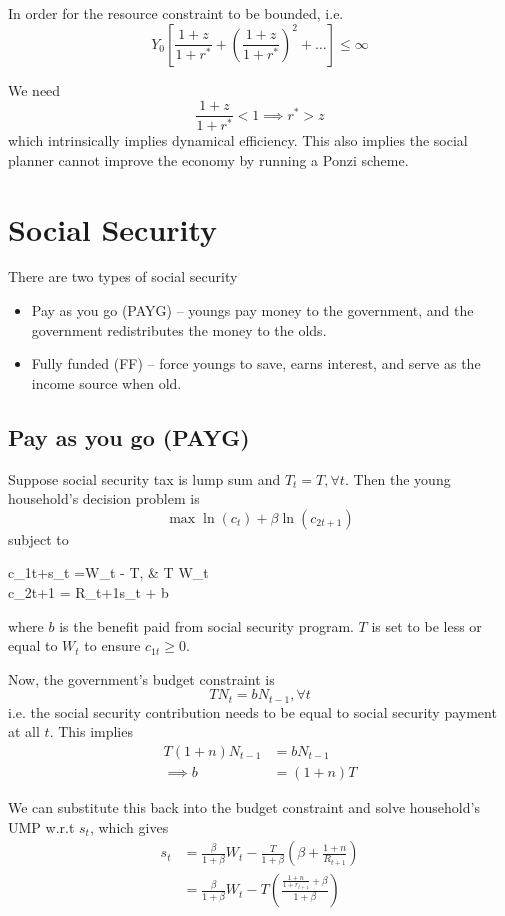 \documentclass[twocolumn, fleqn]{article}
\begin{document}
		In order for the resource constraint to be bounded, i.e.
		\[Y_0\left[ \frac{1+z}{1+r^\ast} + \left( \frac{1+z}{1+r^\ast} \right)^2 +\ldots \right]\leq \infty\]

		We need \[\frac{1+z}{1+r^\ast}<1 \implies r^\ast >z\]
		which intrinsically implies dynamical efficiency.
		This also implies the social planner cannot improve the economy by running a Ponzi scheme.

	\section{Social Security}\label{sec:social-security}
		There are two types of social security
		\begin{itemize}
			\item Pay as you go (PAYG) -- youngs pay money to the government, and the government redistributes the
			money to the olds.
			\item Fully funded (FF) -- force youngs to save, earns interest, and serve as the income source when old.
		\end{itemize}

		\subsection{Pay as you go (PAYG)}\label{subsec:pay-as-you-go-(payg)}
			Suppose social security tax is lump sum and $T_t=T, \forall t$.
			Then the young household's decision problem is \[\max \ln(c_t)+\beta \ln (c_{2t+1})\]
			subject to
			\begin{cases}
				c_{1t}+s_t =W_t - T, & T \leq W_t\\
				c_{2t+1} = R_{t+1}s_t + b
			\end{cases}

			where $b$ is the benefit paid from social security program.
			$T$ is set to be less or equal to $W_t$ to ensure $c_{1t}\geq 0$.

			Now, the government's budget constraint is \[TN_t = b N_{t-1}, \forall t\]
			i.e. the social security contribution needs to be equal to social security payment at all $t$.
			This implies
			\begin{align*}
				T(1+n)N_{t-1} &= b N_{t-1}\\
				\implies b &= (1+n)T
			\end{align*}

			We can substitute this back into the budget constraint and solve household's UMP w.r.t $s_t$, which gives
			\begin{align*}
				s_t &= \frac{\beta}{1+\beta}W_t - \frac{T}{1+\beta}(\beta + \frac{1+n}{R_{t+1}})\\
				&= \frac{\beta}{1+\beta}W_t - T \left( \frac{\frac{1+n}{1+r_{t+1}}+\beta}{1+\beta} \right)
			\end{align*}
\end{document}
